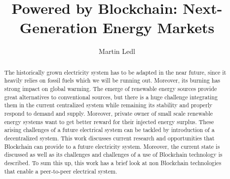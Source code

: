 \documentclass[runningheads]{llncs}
\begin{document}
%
\title{Powered by Blockchain: Next-Generation Energy Markets}
%
%
\author{Martin Ledl}
%
%
%
\maketitle              %
%
\begin{abstract}
The historically grown electricity system has to be adapted in the near future, since it heavily relies on fossil fuels which we will be running out. Moreover, its burning has strong impact on global warming. The emerge of renewable energy sources provide great alternatives to conventional sources, but there is a huge challenge integrating them in the current centralized system while remaining its stability and properly respond to demand and supply. Moreover, private owner of small scale renewable energy systems want to get better reward for their injected energy surplus. These arising challenges of a future electrical system can be tackled by introduction of a decentralized system. This work discusses current research and opportunities that Blockchain can provide to a future electricity system. Moreover, the current state is discussed as well as its challenges and challenges of a use of Blockchain technology is described. To sum this up, this work has a brief look at non Blockchain technologies that enable a peer-to-peer electrical system.

\end{abstract}
%
%
%
\end{document}
